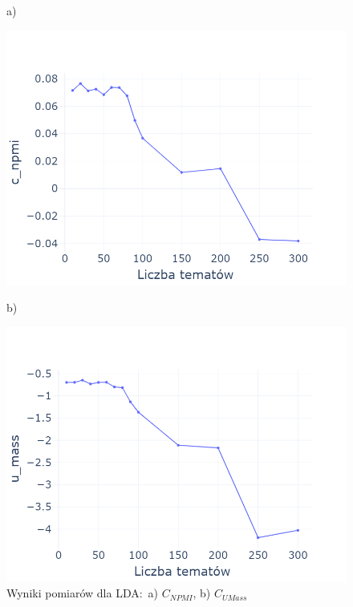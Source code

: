 	\begin{figure}[htb]
		\centering
		\begin{minipage}{.5\textwidth}
			a)\par\medskip %
			\includegraphics[width=\linewidth]{rys05/lda_c_npmi.png}
		\end{minipage}%
		\begin{minipage}{.5\textwidth}
			b)\par\medskip %
			\includegraphics[width=\linewidth]{rys05/lda_u_mass.png}
		\end{minipage}
		\caption{Wyniki pomiarów dla LDA:\ a) \(C_{NPMI}\), b) \(C_{UMass}\)}\label{fig:lda_scores} %
	\end{figure}

